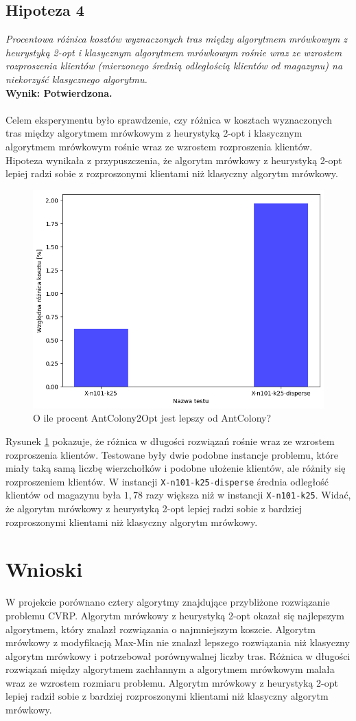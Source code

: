 \documentclass{article}
\begin{document}
\subsection{Hipoteza 4}
\textit{Procentowa różnica kosztów wyznaczonych tras między algorytmem mrówkowym z heurystyką 2-opt i klasycznym algorytmem mrówkowym rośnie wraz ze wzrostem rozproszenia klientów (mierzonego średnią odległością klientów od magazynu) na niekorzyść klasycznego algorytmu.}
\\
\textbf{Wynik: Potwierdzona.}
\\ \\
Celem eksperymentu było sprawdzenie, czy różnica w kosztach wyznaczonych tras między algorytmem mrówkowym z heurystyką 2-opt i klasycznym algorytmem mrówkowym rośnie wraz ze wzrostem rozproszenia klientów. Hipoteza wynikała z przypuszczenia, że algorytm mrówkowy z heurystyką 2-opt lepiej radzi sobie z rozproszonymi klientami niż klasyczny algorytm mrówkowy.

\begin{figure}[H]
    \centering
    \includegraphics[width=0.48\linewidth]{img/disperse.png}
    \caption{O ile procent AntColony2Opt jest lepszy od AntColony?}
    \label{fig:disperse}
\end{figure}
\noindent Rysunek \ref{fig:disperse} pokazuje, że różnica w długości rozwiązań rośnie wraz ze wzrostem rozproszenia klientów. Testowane były dwie podobne instancje problemu, które miały taką samą liczbę wierzchołków i podobne ułożenie klientów, ale różniły się rozproszeniem klientów. W instancji \texttt{X-n101-k25-disperse} średnia odległość klientów od magazynu była $1,78$ razy większa niż w instancji \texttt{X-n101-k25}. Widać, że algorytm mrówkowy z heurystyką 2-opt lepiej radzi sobie z bardziej rozproszonymi klientami niż klasyczny algorytm mrówkowy.

\section{Wnioski}

W projekcie porównano cztery algorytmy znajdujące przybliżone rozwiązanie problemu CVRP. Algorytm mrówkowy z heurystyką 2-opt okazał się najlepszym algorytmem, który znalazł rozwiązania o najmniejszym koszcie. Algorytm mrówkowy z modyfikacją Max-Min nie znalazł lepszego rozwiązania niż klasyczny algorytm mrówkowy i potrzebował porównywalnej liczby tras. Różnica w długości rozwiązań między algorytmem zachłannym a algorytmem mrówkowym malała wraz ze wzrostem rozmiaru problemu. Algorytm mrówkowy z heurystyką 2-opt lepiej radził sobie z bardziej rozproszonymi klientami niż klasyczny algorytm mrówkowy.

\nocite{*}


\end{document}
